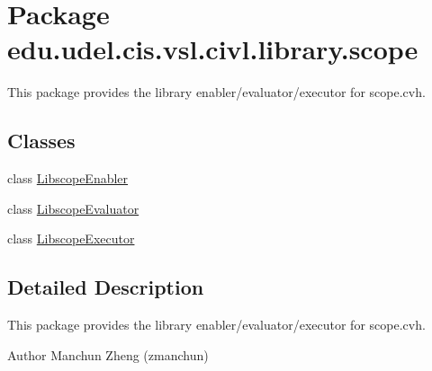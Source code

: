\hypertarget{namespaceedu_1_1udel_1_1cis_1_1vsl_1_1civl_1_1library_1_1scope}{}\section{Package edu.\+udel.\+cis.\+vsl.\+civl.\+library.\+scope}
\label{namespaceedu_1_1udel_1_1cis_1_1vsl_1_1civl_1_1library_1_1scope}


This package provides the library enabler/evaluator/executor for scope.\+cvh.  


\subsection*{Classes}
\begin{DoxyCompactItemize}
\item 
class \hyperlink{classedu_1_1udel_1_1cis_1_1vsl_1_1civl_1_1library_1_1scope_1_1LibscopeEnabler}{Libscope\+Enabler}
\item 
class \hyperlink{classedu_1_1udel_1_1cis_1_1vsl_1_1civl_1_1library_1_1scope_1_1LibscopeEvaluator}{Libscope\+Evaluator}
\item 
class \hyperlink{classedu_1_1udel_1_1cis_1_1vsl_1_1civl_1_1library_1_1scope_1_1LibscopeExecutor}{Libscope\+Executor}
\end{DoxyCompactItemize}


\subsection{Detailed Description}
This package provides the library enabler/evaluator/executor for scope.\+cvh. 

\begin{DoxyAuthor}{Author}
Manchun Zheng (zmanchun) 
\end{DoxyAuthor}
